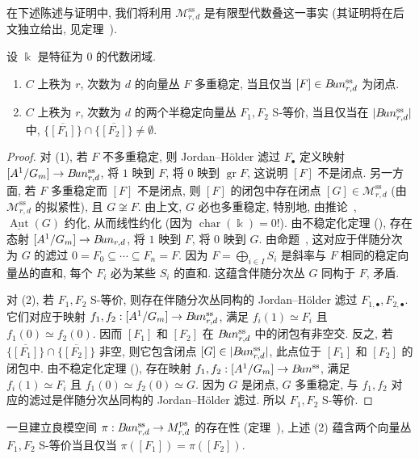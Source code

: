 在下述陈述与证明中, 我们将利用 $\mathcal M_{r,d}^{\mathrm{ss}}$ 是有限型代数叠这一事实 (其证明将在后文独立给出, 见定理~).
\begin{proposition}\label{src:9.1.35}
设 $\Bbbk$ 是特征为 $0$ 的代数闭域.
\begin{enumerate}[(1)]
\item $C$ 上秩为 $r$, 次数为 $d$ 的向量丛 $F$ 多重稳定, 当且仅当 $[F]\in B\!un_{r,d}^{\mathrm{ss}}$ 为闭点.
\item $C$ 上秩为 $r$, 次数为 $d$ 的两个半稳定向量丛 $F_1,F_2$ S-等价, 当且仅当在 $|B\!un_{r,d}^{\mathrm{ss}}|$ 中, $\overline{\{[F_1]\}}\cap\overline{\{[F_2]\}}\ne\emptyset$.
\end{enumerate}
\end{proposition}
\begin{proof}
对 (1), 若 $F$ 不多重稳定, 则 Jordan--H\"older 滤过 $F_\bullet$ 定义映射 $[A^1/G_m]\to B\!un_{r,d}^{\mathrm{ss}}$, 将 $1$ 映到 $F$, 将 $0$ 映到 $\operatorname{gr}F$, 这说明 $[F]$ 不是闭点. 另一方面, 若 $F$ 多重稳定而 $[F]$ 不是闭点, 则 $[F]$ 的闭包中存在闭点 $[G]\in\mathcal M_{r,d}^{\mathrm{ss}}$ (由 $\mathcal M_{r,d}^{\mathrm{ss}}$ 的拟紧性), 且 $G\not\cong F$. 由上文, $G$ 必也多重稳定, 特别地, 由推论~, $\underline{\operatorname{Aut}}(G)$ 约化, 从而线性约化 (因为 $\operatorname{char}(\Bbbk)=0$!). 由不稳定化定理 (), 存在态射 $[A^1/G_m]\to B\!un_{r,d}$, 将 $1$ 映到 $F$, 将 $0$ 映到 $G$. 由命题~, 这对应于伴随分次为 $G$ 的滤过 $0=F_0\subseteq\cdots\subseteq F_n=F$. 因为 $F=\bigoplus_{i\in I}S_i$ 是斜率与 $F$ 相同的稳定向量丛的直和, 每个 $F_i$ 必为某些 $S_i$ 的直和. 这蕴含伴随分次丛 $G$ 同构于 $F$, 矛盾.

对 (2), 若 $F_1,F_2$ S-等价, 则存在伴随分次丛同构的 Jordan--H\"older 滤过 $F_{1,\bullet},F_{2,\bullet}$. 它们对应于映射 $f_1,f_2:[A^1/G_m]\to B\!un_{r,d}^{\mathrm{ss}}$, 满足 $f_i(1)\simeq F_i$ 且 $f_1(0)\simeq f_2(0)$. 因而 $[F_1]$ 和 $[F_2]$ 在 $B\!un_{r,d}^{\mathrm{ss}}$ 中的闭包有非空交. 反之, 若 $\overline{\{[F_1]\}}\cap\overline{\{[F_2]\}}$ 非空, 则它包含闭点 $[G]\in|B\!un_{r,d}^{\mathrm{ss}}|$, 此点位于 $[F_1]$ 和 $[F_2]$ 的闭包中. 由不稳定化定理 (), 存在映射 $f_1,f_2:[A^1/G_m]\to B\!un^{\mathrm{ss}}$, 满足 $f_i(1)\simeq F_i$ 且 $f_1(0)\simeq f_2(0)\simeq G$. 因为 $G$ 是闭点, $G$ 多重稳定, 与 $f_1,f_2$ 对应的滤过是伴随分次丛同构的 Jordan--H\"older 滤过. 所以 $F_1,F_2$ S-等价.
\end{proof}
一旦建立良模空间 $\pi:B\!un_{r,d}^{\mathrm{ss}}\to M_{r,d}^{\mathrm{ps}}$ 的存在性 (定理~), 上述 (2) 蕴含两个向量丛 $F_1,F_2$ S-等价当且仅当 $\pi([F_1])=\pi([F_2])$.
